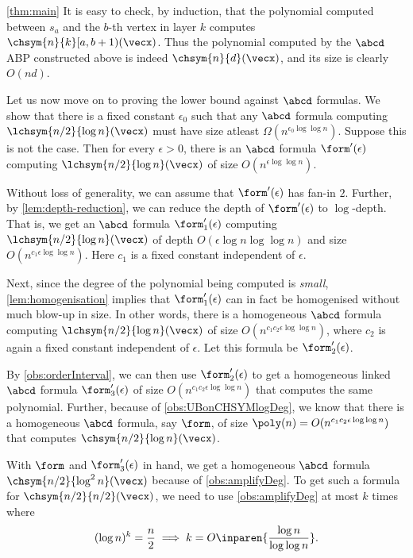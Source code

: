 \begin{proofof}{\autoref{thm:main}}
	It is easy to check, by induction, that the polynomial computed between $s_a$ and the $b$-th vertex in layer $k$ computes $\chsym{n}{k}[a,b+1)(\vecx)$. 
	Thus the polynomial computed by the $\abcd$ ABP constructed above is indeed $\chsym{n}{d}(\vecx)$, and its size is clearly $O(nd)$.
	
	Let us now move on to proving the lower bound against $\abcd$ formulas.
	We show that there is a fixed constant $\epsilon_0$ such that any $\abcd$ formula computing $\lchsym{n/2}{\log n}(\vecx)$ must have size atleast $\Omega(n^{\epsilon_0 \log \log n})$.
	Suppose this is not the case. 
	Then for every $\epsilon > 0$, there is an $\abcd$ formula $\form'(\epsilon)$ computing $\lchsym{n/2}{\log n}(\vecx)$ of size $O(n^{\epsilon \log \log n})$.
	
	Without loss of generality, we can assume that $\form'(\epsilon)$ has fan-in $2$.
	Further, by \autoref{lem:depth-reduction}, we can reduce the depth of $\form'(\epsilon)$ to $\log$-depth.
	That is, we get an $\abcd$ formula $\form'_1(\epsilon)$ computing $\lchsym{n/2}{\log n}(\vecx)$ of depth $O(\epsilon \log n \log \log n)$ and size $O(n^{c_1 \epsilon \log \log n})$.
	Here $c_1$ is a fixed constant independent of $\epsilon$. 

	Next, since the degree of the polynomial being computed is \emph{small}, \autoref{lem:homogenisation} implies that $\form'_1(\epsilon)$ can in fact be homogenised without much blow-up in size. 
	In other words, there is a homogeneous $\abcd$ formula computing $\lchsym{n/2}{\log n}(\vecx)$ of size $O(n^{c_1 c_2 \epsilon \log \log n})$, where $c_2$ is again a fixed constant independent of $\epsilon$. 
	Let this formula be $\form'_2(\epsilon)$.

	By \autoref{obs:orderInterval}, we can then use $\form'_2(\epsilon)$ to get a homogeneous linked $\abcd$ formula $\form'_3(\epsilon)$ of size $O(n^{c_1 c_2 \epsilon \log \log n})$ that computes the same polynomial.
	Further, because of \autoref{obs:UBonCHSYMlogDeg}, we know that there is a homogeneous $\abcd$ formula, say $\form$, of size $\poly(n) = O(n^{c_1 c_2 \epsilon \log \log n})$ that computes $\chsym{n/2}{\log n}(\vecx)$.
	
	With $\form$ and $\form'_3(\epsilon)$ in hand, we get a homogeneous $\abcd$ formula $\chsym{n/2}{\log^2 n}(\vecx)$ because of \autoref{obs:amplifyDeg}.
	To get such a formula for $\chsym{n/2}{n/2}(\vecx)$, we need to use \autoref{obs:amplifyDeg} at most $k$ times where 
	\[
		(\log n)^k = \frac{n}{2} \implies k = O \inparen{\frac{\log n}{\log \log n}}.
	\]


\end{proofof}
